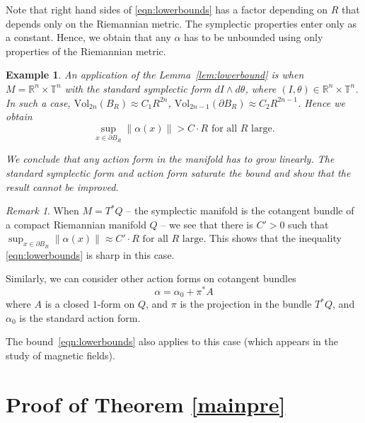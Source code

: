 \documentclass[11pt]{amsart}
\newtheorem{ex}[thm]{Example}
\theoremstyle{definition}
\theoremstyle{remark}
\newtheorem{rem}[thm]{Remark}
\numberwithin{equation}{section}
\newcommand{\R}{\mathbb R}
\newcommand{\T}{\mathbb T}
\begin{document}
Note that  right hand sides of \eqref{eqn:lowerbounds} has a factor depending on $R$ that
depends only on
the Riemannian metric. The symplectic properties enter only as a constant.
Hence, we obtain that any $\alpha$ has to be unbounded using only properties of
the Riemannian metric.



\begin{ex} An application of the Lemma~\ref{lem:lowerbound}
is when $M  = \R^n \times  \T^n$ with the standard symplectic form $dI\wedge d\theta$, where $(I,\theta)\in \R^n\times\T^n$.
In such a case, $\textrm{Vol}_{2n}(B_R) \approx  C_1 R^{2n}$,
$\textrm{Vol}_{2n-1}(\partial B_R) \approx  C_2 R^{2n-1}$.
Hence we obtain
\begin{equation}\sup_{x \in \partial B_R}  \|\alpha(x)\|  >  C\cdot R   \textrm { for all $R$ large.}
\label{linearbound}
\end{equation}



We conclude that any action form in the manifold has to grow
linearly. The standard symplectic form and action form
saturate the bound and show that the result
cannot be improved.
\end{ex}

\begin{rem} \label{tautologicalform}
When $M  = T^* Q$ -- the symplectic manifold is the
cotangent bundle of a compact Riemannian manifold $Q$ --
we see that there is $C'>0$ such that $\sup_{x \in \partial B_R}  \|\alpha (x) \|  \approx  C'\cdot R   \textrm { for all $R$ large}$.
This shows that the inequality \eqref{eqn:lowerbounds} is sharp in this case.

Similarly, we can consider other  action forms on cotangent bundles
\begin{equation}\label{eqn:minimalcoupling}
\alpha =\alpha_0 + \pi^* A
\end{equation}
where $A$ is a closed $1$-form on $Q$,
and $\pi$ is the projection in the bundle $T^*Q$,
and $\alpha_0$ is the standard action form.

The bound~\eqref{eqn:lowerbounds}
also applies to this case (which appears in the study of magnetic fields).
\end{rem}








\section{Proof  of Theorem \ref{mainpre}}
\label{sec:proofs_presymplectic}
\end{document}
